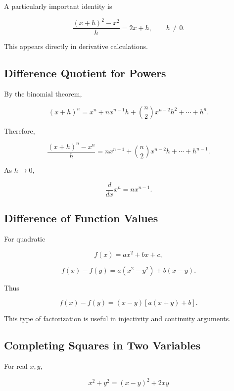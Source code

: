 A particularly important identity is

\[
\boxed{
\frac{
(x+h)^2-x^2
}{
h
}
=
2x+h,
\qquad
h\neq0.
}
\]

This appears directly in derivative calculations.

\subsection{Difference Quotient for Powers}
\label{subsec:difference-quotient-powers}

By the binomial theorem,

\[
(x+h)^n
=
x^n
+
nx^{n-1}h
+
\binom n2x^{n-2}h^2
+
\cdots
+
h^n.
\]

Therefore,

\[
\boxed{
\frac{
(x+h)^n-x^n
}{
h
}
=
nx^{n-1}
+
\binom n2x^{n-2}h
+
\cdots
+
h^{n-1}.
}
\]

As \(h\to0\),

\[
\boxed{
\frac{d}{dx}x^n
=
nx^{n-1}.
}
\]

\subsection{Difference of Function Values}
\label{subsec:function-difference-factorization}

For quadratic

\[
f(x)=ax^2+bx+c,
\]

\[
f(x)-f(y)
=
a(x^2-y^2)+b(x-y).
\]

Thus

\[
\boxed{
f(x)-f(y)
=
(x-y)
\left[
a(x+y)+b
\right].
}
\]

This type of factorization is useful in injectivity and continuity arguments.

\subsection{Completing Squares in Two Variables}
\label{subsec:completing-squares-two-variables}

For real \(x,y\),

\[
\boxed{
x^2+y^2
=
(x-y)^2+2xy
}
\]

